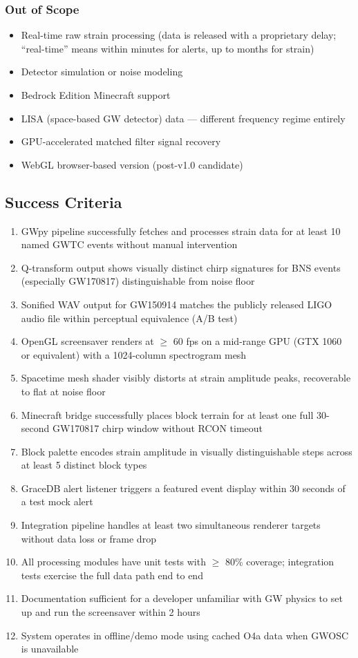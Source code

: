 \documentclass[11pt,letterpaper]{article}
\begin{document}
\subsubsection{Out of Scope}

\begin{itemize}[noitemsep]
  \item Real-time raw strain processing (data is released with a proprietary delay; ``real-time'' means within minutes for alerts, up to months for strain)
  \item Detector simulation or noise modeling
  \item Bedrock Edition Minecraft support
  \item LISA (space-based GW detector) data --- different frequency regime entirely
  \item GPU-accelerated matched filter signal recovery
  \item WebGL browser-based version (post-v1.0 candidate)
\end{itemize}

\subsection{Success Criteria}

\begin{enumerate}
  \item GWpy pipeline successfully fetches and processes strain data for at least 10 named GWTC events without manual intervention
  \item Q-transform output shows visually distinct chirp signatures for BNS events (especially GW170817) distinguishable from noise floor
  \item Sonified WAV output for GW150914 matches the publicly released LIGO audio file within perceptual equivalence (A/B test)
  \item OpenGL screensaver renders at $\geq$ 60 fps on a mid-range GPU (GTX 1060 or equivalent) with a 1024-column spectrogram mesh
  \item Spacetime mesh shader visibly distorts at strain amplitude peaks, recoverable to flat at noise floor
  \item Minecraft bridge successfully places block terrain for at least one full 30-second GW170817 chirp window without RCON timeout
  \item Block palette encodes strain amplitude in visually distinguishable steps across at least 5 distinct block types
  \item GraceDB alert listener triggers a featured event display within 30 seconds of a test mock alert
  \item Integration pipeline handles at least two simultaneous renderer targets without data loss or frame drop
  \item All processing modules have unit tests with $\geq$ 80\% coverage; integration tests exercise the full data path end to end
  \item Documentation sufficient for a developer unfamiliar with GW physics to set up and run the screensaver within 2 hours
  \item System operates in offline/demo mode using cached O4a data when GWOSC is unavailable
\end{enumerate}
\end{document}
